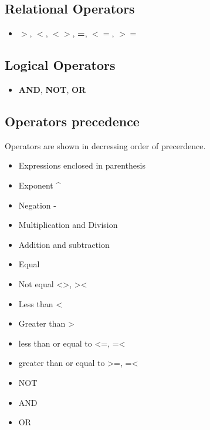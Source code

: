     \subsection{Relational Operators}

    \begin{itemize}
        \item \textbf{$>$}, \textbf{$<$}, \textbf{$<>$}, \textbf{=},
        \textbf{$<=$}, \textbf{$>=$}
    \end{itemize}

    \subsection{Logical Operators}

    \begin{itemize}
        \item \textbf{AND}, \textbf{NOT}, \textbf{OR}
    \end{itemize}

    \subsection{Operators precedence}
    Operators are shown in decressing order of precerdence.

    \begin{itemize}
        \item Expressions enclosed in parenthesis
        \item Exponent \textasciicircum
        \item Negation -
        \item Multiplication and Division
        \item Addition and subtraction
        \item Equal
        \item Not equal <>, ><
        \item Less than <
        \item Greater than >
        \item less than or equal to <=, =<
        \item greater than or equal to >=, =<
        \item NOT
        \item AND
        \item OR
    \end{itemize}

